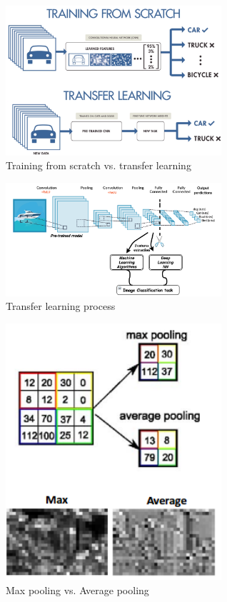 \documentclass[twocolumn]{article}
\begin{document}
\begin{figure}[h]
\centering
\includegraphics[width=8cm]{./figures/training from scratch vs. transfer learning}
\caption{Training from scratch vs. transfer learning}
\end{figure}

\begin{figure}[h]
\centering
\includegraphics[width=8cm]{./figures/transfer learning process}
\caption{Transfer learning process}
\end{figure}

\begin{figure}[h]
\centering
\includegraphics[width=8cm]{./figures/max pooling vs. average pooling}
\caption{Max pooling vs. Average pooling}
\end{figure}
\end{document}
